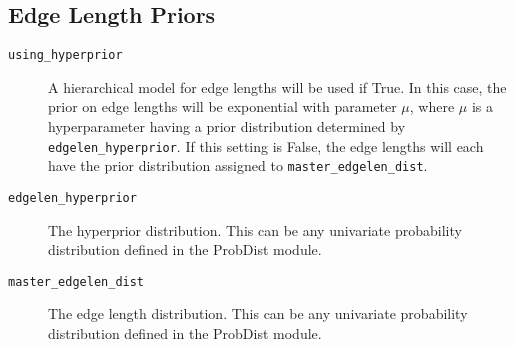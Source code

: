 \documentclass[10pt]{article}
\begin{document}
\subsection{Edge Length Priors}
\begin{description}
\item[{\tt using\_hyperprior}] A hierarchical model for edge lengths will be used if True. In this case, the prior on edge lengths will be exponential with parameter $\mu$, where $\mu$ is a hyperparameter having a prior distribution determined by \verb+edgelen_hyperprior+. If this setting is False, the edge lengths will each have the prior distribution assigned to \verb+master_edgelen_dist+.
\item[{\tt edgelen\_hyperprior}] The hyperprior distribution. This can be any univariate probability distribution defined in the ProbDist module.
\item[{\tt master\_edgelen\_dist}] The edge length distribution.  This can be any univariate probability distribution defined in the ProbDist module.
\end{description}
\end{document}
